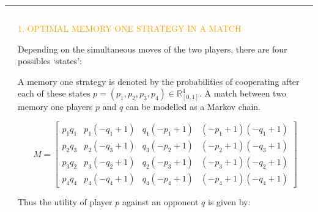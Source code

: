 \documentclass[usenames,dvipsnames,t]{beamer}
\newcommand{\R}{\mathbb{R}}
\begin{document}
\hrule height 5pt
\begin{columns}
    \begin{column}{.05\linewidth}
    \end{column}
    \begin{column}{.4\linewidth}
        \vspace{0.9cm}

        \begin{center}
        \textcolor{orange}{\large{1. OPTIMAL MEMORY ONE STRATEGY IN A MATCH}}
        \end{center}
        \vspace{0.3cm}

        \small{
        Depending on the simultaneous moves of the two players, there are four
        possibles `states':}

        \begin{center}
            
        \end{center}

        \small{
        A memory one strategy is denoted by the probabilities of cooperating after each of these states \(p = (p_1, p_2, p_3, p_4) \in \R_{[0,1]} ^ 4\).%
        A match between two memory one players \(p\) and \(q\) can be modelled as
        a Markov chain.}

        \begin{equation*}
        M = \left[\begin{matrix}p_{1} q_{1} & p_{1} \left(- q_{1} + 1\right) & q_{1} \left(- p_{1} + 1\right) & \left(- p_{1} + 1\right) \left(- q_{1} + 1\right)\\
        p_{2} q_{3} & p_{2} \left(- q_{3} + 1\right) & q_{3} \left(- p_{2} + 1\right) & \left(- p_{2} + 1\right) \left(- q_{3} + 1\right)\\
        p_{3} q_{2} & p_{3} \left(- q_{2} + 1\right) & q_{2} \left(- p_{3} + 1\right) & \left(- p_{3} + 1\right) \left(- q_{2} + 1\right)\\
        p_{4} q_{4} & p_{4} \left(- q_{4} + 1\right) & q_{4} \left(- p_{4} + 1\right) & \left(- p_{4} + 1\right) \left(- q_{4} + 1\right)\end{matrix}\right]
        \end{equation*}
        \vspace{0.3cm}

        Thus the utility of player \(p\) against an opponent \(q\) is given by:


\end{column}
\end{columns}
\end{document}
